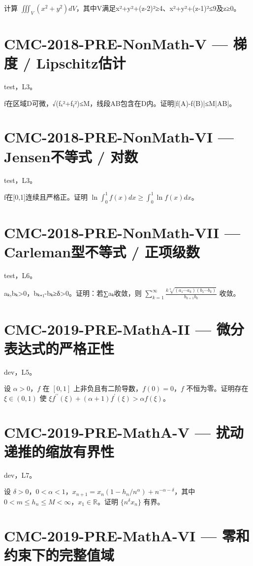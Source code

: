 \documentclass[UTF8]{ctexart}
\begin{document}
计算 $\iiint_V(x^2+y^2)dV$，其中V满足x²+y²+(z-2)²≥4、x²+y²+(z-1)²≤9及z≥0。

\section*{CMC-2018-PRE-NonMath-V — 梯度 / Lipschitz估计}

test，L3。

f在区域D可微，√(fₓ²+fᵧ²)≤M，线段AB包含在D内。证明|f(A)-f(B)|≤M|AB|。

\section*{CMC-2018-PRE-NonMath-VI — Jensen不等式 / 对数}

test，L3。

f在[0,1]连续且严格正。证明 $\ln\int_0^1f(x)dx\ge\int_0^1\ln f(x)dx$。

\section*{CMC-2018-PRE-NonMath-VII — Carleman型不等式 / 正项级数}

test，L6。

aₖ,bₖ>0，bₖ₊₁-bₖ≥δ>0。证明：若∑aₖ收敛，则 $\sum_{k=1}^\infty\frac{k\sqrt[k]{(a_1\cdots a_k)(b_1\cdots b_k)}}{b_{k+1}b_k}$ 收敛。

\section*{CMC-2019-PRE-MathA-II — 微分表达式的严格正性}

dev，L5。

设 $\alpha>0$，$f$ 在 $[0,1]$ 上非负且有二阶导数，$f(0)=0$，$f$ 不恒为零。证明存在 $\xi\in(0,1)$ 使 $\xi f^{\prime\prime}(\xi)+(\alpha+1)f^{\prime}(\xi)>\alpha f(\xi)$。

\section*{CMC-2019-PRE-MathA-V — 扰动递推的缩放有界性}

dev，L7。

设 $\delta>0$，$0<\alpha<1$，$x_{n+1}=x_n(1-h_n/n^\alpha)+n^{-\alpha-\delta}$，其中 $0<m\le h_n\le M<\infty$，$x_1\in\mathbb R$。证明 $\{n^\delta x_n\}$ 有界。

\section*{CMC-2019-PRE-MathA-VI — 零和约束下的完整值域}
\end{document}

